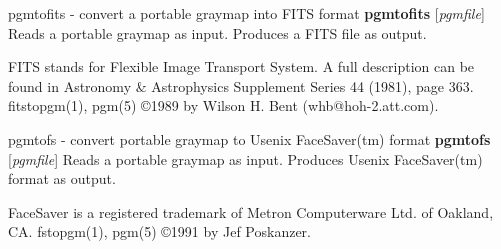 pgmtofits - convert a portable graymap into FITS format
{\bf pgmtofits}
{\rm [}{\it pgmfile}{\rm ]}
Reads a portable graymap as input.
Produces a FITS file as output.
\par
FITS stands for Flexible Image Transport System.  A full description
can be found in Astronomy \& Astrophysics Supplement Series 44 (1981),
page 363.
fitstopgm(1), pgm(5)
\copyright 1989 by Wilson H. Bent (whb@hoh-2.att.com).
%
 
%

\newpage
%

pgmtofs - convert portable graymap to Usenix FaceSaver(tm) format
{\bf pgmtofs}
{\rm [}{\it pgmfile}{\rm ]}
Reads a portable graymap as input.
Produces Usenix FaceSaver(tm) format as output.
\par
FaceSaver is a registered trademark of Metron Computerware Ltd. of
Oakland, CA.
fstopgm(1), pgm(5)
\copyright 1991 by Jef Poskanzer.
%
 
